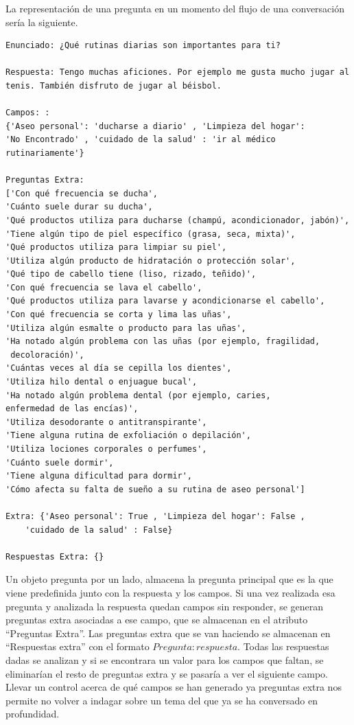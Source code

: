 La representación de una pregunta en un momento del flujo de una conversación sería la siguiente. 
\begin{verbatim}
Enunciado: ¿Qué rutinas diarias son importantes para ti? 

Respuesta: Tengo muchas aficiones. Por ejemplo me gusta mucho jugar al
tenis. También disfruto de jugar al béisbol.

Campos: :
{'Aseo personal': 'ducharse a diario' , 'Limpieza del hogar':
'No Encontrado' , 'cuidado de la salud' : 'ir al médico rutinariamente'}

Preguntas Extra:
['Con qué frecuencia se ducha',
'Cuánto suele durar su ducha',
'Qué productos utiliza para ducharse (champú, acondicionador, jabón)',
'Tiene algún tipo de piel específico (grasa, seca, mixta)',
'Qué productos utiliza para limpiar su piel',
'Utiliza algún producto de hidratación o protección solar',
'Qué tipo de cabello tiene (liso, rizado, teñido)',
'Con qué frecuencia se lava el cabello',
'Qué productos utiliza para lavarse y acondicionarse el cabello',
'Con qué frecuencia se corta y lima las uñas',
'Utiliza algún esmalte o producto para las uñas',
'Ha notado algún problema con las uñas (por ejemplo, fragilidad,
 decoloración)',
'Cuántas veces al día se cepilla los dientes',
'Utiliza hilo dental o enjuague bucal',
'Ha notado algún problema dental (por ejemplo, caries, 
enfermedad de las encías)',
'Utiliza desodorante o antitranspirante',
'Tiene alguna rutina de exfoliación o depilación',
'Utiliza lociones corporales o perfumes',
'Cuánto suele dormir',
'Tiene alguna dificultad para dormir',
'Cómo afecta su falta de sueño a su rutina de aseo personal']

Extra: {'Aseo personal': True , 'Limpieza del hogar': False , 
	'cuidado de la salud' : False}

Respuestas Extra: {}
\end{verbatim}

Un objeto pregunta por un lado, almacena la pregunta principal que es la que viene predefinida junto con la respuesta y los campos. Si una vez realizada esa pregunta y analizada la respuesta quedan campos sin responder, se generan preguntas extra asociadas a ese campo, que se almacenan en el atributo ``Preguntas Extra''. Las preguntas extra que se van haciendo se almacenan en ``Respuestas extra'' con el formato ${Pregunta:respuesta}$. Todas las respuestas dadas se analizan y si se encontrara un valor para los campos que faltan, se eliminarían el resto de preguntas extra y se pasaría a ver el siguiente campo. Llevar un control acerca de qué campos se han generado ya preguntas extra nos permite no volver a indagar sobre un tema del que ya se ha conversado en profundidad. 

